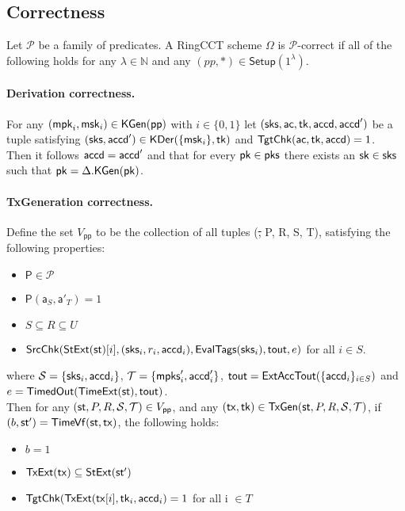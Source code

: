 \subsection{Correctness}
\begin{definition}[Correctness] 
    Let $\mathcal{P}$ be a family of predicates. A RingCCT scheme $\Omega$ is $\mathcal{P}$-correct if all of the following holds for any $\lambda \in \mathbb{N}$ and any $(pp, *) \in \mathsf{Setup}(1^\lambda)$.
\end{definition}

\paragraph*{Derivation correctness.} For any $(\mathsf{mpk}_i, \mathsf{msk}_i) \in \mathsf{KGen}(\mathsf{pp})$ with $i \in \{0, 1\}$ let $(\mathsf{sks}, \mathsf{ac}, \mathsf{tk}, \mathsf{accd}, \mathsf{accd}')$ be a tuple satisfying  $(\mathsf{sks}, \mathsf{accd}') \in \mathsf{KDer}(\{\mathsf{msk}_i\}, \mathsf{tk})$ and $\mathsf{TgtChk}(\mathsf{ac}, \mathsf{tk}, \mathsf{accd}) = 1$. \\ Then it follows $\mathsf{accd} = \mathsf{accd}'$ and  that for every $\mathsf{pk} \in \mathsf{pks}$ there exists an $\mathsf{sk} \in \mathsf{sks}$ such that $\mathsf{pk} = \Delta.\mathsf{KGen}(\mathsf{pk})$.

\paragraph*{TxGeneration correctness.} Define the set $V_\mathsf{pp}$ to be the collection of all tuples (\st, P, R, S, T), satisfying the following properties:
\begin{itemize}
\item $\mathsf{P} \in \mathcal{P}$
\item $\mathsf{P}(\mathsf{a}_S, \mathsf{a}'_T) = 1$
\item $S \subseteq R \subseteq U$
\item $\mathsf{SrcChk}(\mathsf{StExt}(\mathsf{st})[i], (\mathsf{sks}_{i}, r_i, \mathsf{accd}_i), \mathsf{EvalTags}(\mathsf{sks}_i), \mathsf{tout}, e)$ for all $i \in S$.
\end{itemize}

where $\mathcal{S} = \{ \mathsf{sks}_i, \mathsf{accd}_i \}$, $\mathcal{T} = \{ \mathsf{mpks}'_i, \mathsf{accd}'_i \}$, $\mathsf{tout} = \mathsf{ExtAccTout}(\{\mathsf{accd}_i \}_{i \in S})$ and $\expired = \mathsf{TimedOut}(\mathsf{TimeExt}(\st), \tout)$. \\ 
Then for any $(\st, P, R, \mathcal{S}, \mathcal{T}) \in V_\mathsf{pp}$, and any $(\tx, \mathsf{tk}) \in \mathsf{TxGen}(\st,  P, R, \mathcal{S}, \mathcal{T})$, if $(b, \mathsf{st'}) = \mathsf{TimeVf}(\st, \tx)$, the following holds:
\begin{itemize}
\item $b = 1$
\item $\mathsf{TxExt}(\tx) \subseteq \mathsf{StExt}(\st')$
\item $\mathsf{TgtChk}(\mathsf{TxExt}(\mathsf{tx}[i], \mathsf{tk}_i, \mathsf{accd}_i) = 1$  for all i $\in T$
\end{itemize}

